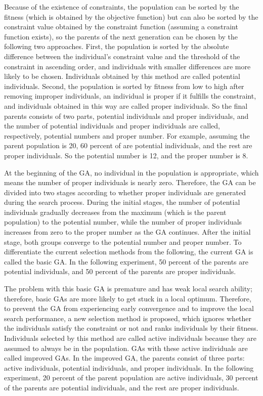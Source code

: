 \documentclass[USenglish,twocolumn]{article}
\begin{document}
Because of the existence of constraints, the population can be sorted by the
fitness (which is obtained by the objective function) but can also be sorted by the constraint value
obtained by the constraint function (assuming a constraint function exists), so the parents of the next
generation can be chosen by the following two approaches. First, the population is sorted by the
absolute difference between the individual's constraint value and the threshold of the constraint in
ascending order, and individuals with smaller differences are more likely to be chosen. Individuals
obtained by this method are called potential individuals. Second, the population is sorted by fitness
from low to high after removing improper individuals, an individual is proper if it
fulfills the constraint, and individuals obtained in this way are called proper individuals. So the
final parents consists of two parts, potential individuals and proper individuals, and the number of
potential individuals and proper individuals are called, respectively, potential numbers and proper
number. For example, assuming the parent population is 20, 60 percent of are potential
individuals, and the rest are proper individuals. So the potential number is 12, and the proper
number is 8.

At the beginning of the GA, no individual in the population is appropriate, which means the number
of proper individuals is nearly zero. Therefore, the GA can be divided into two stages according to whether
proper individuals are generated during the search process. During the initial stages, the number of
potential individuals gradually decreases from the maximum (which is the parent population) to the potential
number, while the number of proper individuals increases from zero to the proper number as the GA
continues. After the initial stage, both groups converge to the
potential number and proper number. To differentiate the current selection methods from
the following, the current GA is called the basic GA. In the following experiment, 50 percent of the
parents are potential individuals, and 50 percent of the parents are proper individuals.

The problem with this basic GA is premature and has weak local search ability; therefore, basic GAs are more likely
to get stuck in a local optimum. Therefore, to prevent the GA from experiencing early convergence and to improve the
local search performance, a new selection method is proposed, which ignores whether the
individuals satisfy the constraint or not and ranks individuals by their fitness. Individuals
selected by this method are called active individuals because they are assumed to always be in the
population. GAs with these active individuals are called improved GAs. In the improved GA, the parents
consist of three parts: active individuals, potential individuals, and proper individuals. In the
following experiment, 20 percent of the parent population are active individuals, 30 percent of the
parents are potential individuals, and the rest are proper individuals.
\end{document}
